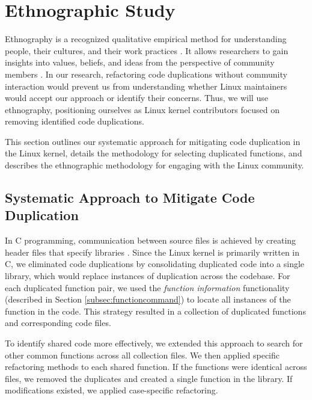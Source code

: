
\section{Ethnographic Study}

\label{sec:meteth}


Ethnography is a recognized qualitative empirical method for understanding people, 
their cultures, and their work practices \citep{bookethno}. It allows researchers 
to gain insights into values, beliefs, and ideas from the perspective of community 
members \citep{ethnosoft}. In our research, refactoring code duplications without 
community interaction would prevent us from understanding whether Linux maintainers 
would accept our approach or identify their concerns. Thus, we will use ethnography, 
positioning ourselves as Linux kernel contributors focused on removing identified 
code duplications.

This section outlines our systematic approach for mitigating code duplication in the Linux kernel, details the methodology for selecting duplicated functions, and describes the ethnographic methodology for engaging with the Linux community.

\subsection{Systematic Approach to Mitigate Code Duplication}
\label{subsec:pipeline}

In C programming, communication between source files is achieved by creating header files that specify libraries \citep{Cbook}. Since the Linux kernel is primarily written in C, we eliminated code duplications by consolidating duplicated code into a single library, which would replace instances of duplication across the codebase.
%
For each duplicated function pair, we used the \textit{function information} functionality (described in Section \ref{subsec:functioncommand}) to locate all instances of the function in the code. This strategy resulted in a collection of duplicated functions and corresponding code files.

To identify shared code more effectively, we extended this approach to search for other common functions across all collection files. We then applied specific refactoring methods to each shared function. If the functions were identical across files, we removed the duplicates and created a single function in the library. If modifications existed, we applied case-specific refactoring.

